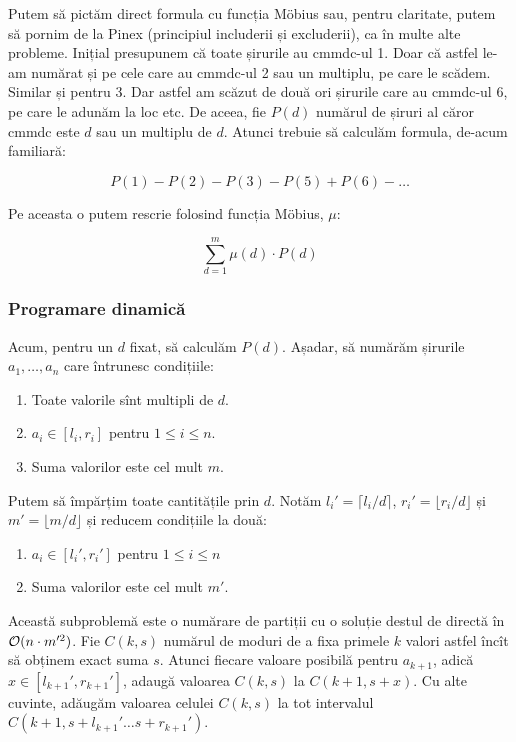 \documentclass[../main.tex]{subfiles}
\begin{document}
Putem să pictăm direct formula cu funcția Möbius sau, pentru claritate, putem să pornim de la Pinex (principiul includerii și excluderii), ca în multe alte probleme. Inițial presupunem că toate șirurile au cmmdc-ul 1. Doar că astfel le-am numărat și pe cele care au cmmdc-ul 2 sau un multiplu, pe care le scădem. Similar și pentru 3. Dar astfel am scăzut de două ori șirurile care au cmmdc-ul 6, pe care le adunăm la loc etc. De aceea, fie $P(d)$ numărul de șiruri al căror cmmdc este $d$ sau un multiplu de $d$. Atunci trebuie să calculăm formula, de-acum familiară:

$$P(1) - P(2) - P(3) - P(5) + P(6) - \dots$$

Pe aceasta o putem rescrie folosind funcția Möbius, $\mu$:

$$\sum_{d=1}^{m} \mu(d) \cdot P(d)$$

\subsubsection*{Programare dinamică}

Acum, pentru un $d$ fixat, să calculăm $P(d)$. Așadar, să numărăm șirurile $a_1, \dots, a_n$ care întrunesc condițiile:

\begin{enumerate}
  \item Toate valorile sînt multipli de $d$.
  \item $a_i \in [l_i, r_i]$ pentru $1 \leq i \leq n$.
  \item Suma valorilor este cel mult $m$.
\end{enumerate}

Putem să împărțim toate cantitățile prin $d$. Notăm $l_i' = \lceil l_i / d \rceil$, $r_i' = \lfloor r_i / d \rfloor$ și $m' = \lfloor m / d \rfloor$ și reducem condițiile la două:

\begin{enumerate}
  \item $a_i \in [l_i', r_i']$ pentru $1 \leq i \leq n$
  \item Suma valorilor este cel mult $m'$.
\end{enumerate}

Această subproblemă este o numărare de partiții cu o soluție destul de directă în $\mathcal{O}(n \cdot m'^2)$. Fie $C(k,s)$ numărul de moduri de a fixa primele $k$ valori astfel încît să obținem exact suma $s$. Atunci fiecare valoare posibilă pentru $a_{k+1}$, adică $x \in [l_{k+1}', r_{k+1}']$, adaugă valoarea $C(k,s)$ la $C(k + 1, s + x)$. Cu alte cuvinte, adăugăm valoarea celulei $C(k,s)$ la tot intervalul $C(k+1, s + l_{k+1}' \dots s + r_{k+1}')$.
\end{document}
